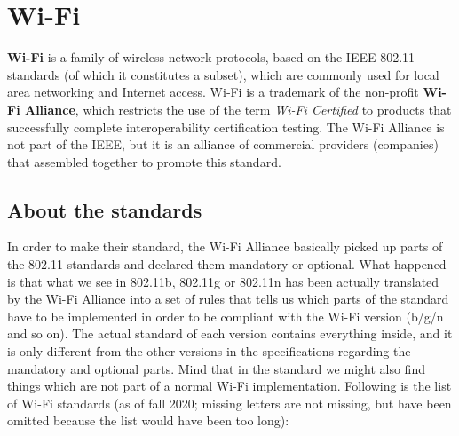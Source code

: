 \chapter{Wi-Fi}
\label{ch:wifi}
\textbf{Wi-Fi} is a family of wireless network protocols, based on the IEEE 802.11 standards (of which it constitutes a subset), which are commonly used for local area networking and Internet access. Wi‑Fi is a trademark of the non-profit \textbf{Wi-Fi Alliance}, which restricts the use of the term \textit{Wi-Fi Certified} to products that successfully complete interoperability certification testing. The Wi-Fi Alliance is not part of the IEEE, but it is an alliance of commercial providers (companies) that assembled together to promote this standard.


\section{About the standards}
In order to make their standard, the Wi-Fi Alliance basically picked up parts of the 802.11 standards and declared them mandatory or optional. What happened is that what we see in 802.11b, 802.11g or 802.11n has been actually translated by the Wi-Fi Alliance into a set of rules that tells us which parts of the standard have to be implemented in order to be compliant with the Wi-Fi version (b/g/n and so on). The actual standard of each version contains everything inside, and it is only different from the other versions in the specifications regarding the mandatory and optional parts. Mind that in the standard we might also find things which are not part of a normal Wi-Fi implementation. Following is the list of Wi-Fi standards (as of fall 2020; missing letters are not missing, but have been omitted because the list would have been too long):

